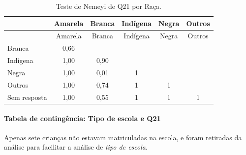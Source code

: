 \documentclass[]{article}
\let\oldparagraph\paragraph
\renewcommand{\paragraph}[1]{\oldparagraph{#1}\mbox{}}
\begin{document}
\begin{longtable}[]{@{}lccccc@{}}
\caption{\label{tab:unnamed-chunk-353}Teste de Nemeyi de Q21 por Raça.}\tabularnewline
\toprule
& Amarela & Branca & Indígena & Negra & Outros\tabularnewline
\midrule
\endfirsthead
\toprule
& Amarela & Branca & Indígena & Negra & Outros\tabularnewline
\midrule
\endhead
Branca & 0,66 & & & &\tabularnewline
Indígena & 1,00 & 0,90 & & &\tabularnewline
Negra & 1,00 & 0,01 & 1 & &\tabularnewline
Outros & 1,00 & 0,74 & 1 & 1 &\tabularnewline
Sem resposta & 1,00 & 0,55 & 1 & 1 & 1\tabularnewline
\bottomrule
\end{longtable}

\cleardoublepage

\hypertarget{tabela-de-continguxeancia-tipo-de-escola-e-q21}{%
\paragraph{Tabela de contingência: Tipo de escola e Q21}\label{tabela-de-continguxeancia-tipo-de-escola-e-q21}}

Apenas sete crianças não estavam matriculadas na escola, e foram retiradas da análise para facilitar a análise de \emph{tipo de escola}.
\end{document}

